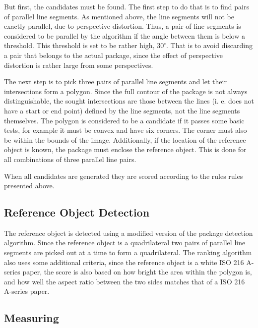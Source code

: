 But first, the candidates must be found.
The first step to do that is to find pairs of parallel line segments. 
As mentioned above, the line segments will not be exactly parallel, due to perspective distortion. %
Thus, a pair of line segments is considered to be parallel by the algorithm if the angle between them is below a threshold. 
This threshold is set to be rather high, $30^\circ$.
That is to avoid discarding a pair that belongs to the actual package, since the effect of perspective distortion is rather large from some perspectives. %

The next step is to pick three pairs of parallel line segments and let their intersections form a polygon. 
Since the full contour of the package is not always distinguishable, the sought intersections are those between the lines (i. e. does not have a start or end point) defined by the line segments, not the line segments themselves. %
The polygon is considered to be a candidate if it passes some basic tests, for example it must be convex and have six corners. 
The corner must also be within the bounds of the image.
Additionally, if the location of the reference object is known, the package must enclose the reference object.
This is done for all combinations of three parallel line pairs.

When all candidates are generated they are scored according to the rules rules presented above.

\subsection{Reference Object Detection}

The reference object is detected using a modified version of the package detection algorithm.
Since the reference object is a quadrilateral two pairs of parallel line segments are picked out at a time to form a quadrilateral.
The ranking algorithm also uses some additional criteria, since the reference object is a white ISO 216 A-series  paper, the score is also based on how bright the area within the polygon is, and how well the aspect ratio between the two sides matches that of a ISO 216 A-series paper.

\subsection{Measuring}

